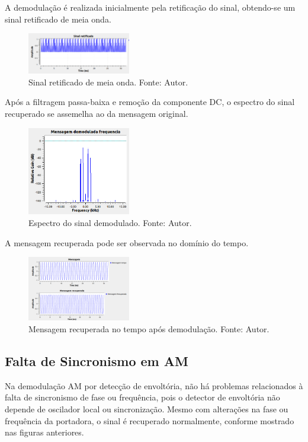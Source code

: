 A demodulação é realizada inicialmente pela retificação do sinal, obtendo-se um sinal retificado de meia onda.

\begin{figure}[!htpb]
    \centering
    \includegraphics[width=0.4\textwidth]{images/retificado_gnu.png}
    \caption{Sinal retificado de meia onda. Fonte: Autor.}
    \label{fig:retificado_am}
\end{figure}

Após a filtragem passa-baixa e remoção da componente DC, o espectro do sinal recuperado se assemelha ao da mensagem original.

\begin{figure}[!htpbh]
    \centering
    \includegraphics[width=0.4\textwidth]{images/mensagem_demodulada_gnu_espectro.png}
    \caption{Espectro do sinal demodulado. Fonte: Autor.}
    \label{fig:espectro_demodulada_am}
\end{figure}

A mensagem recuperada pode ser observada no domínio do tempo.

\begin{figure}[!htpb]
    \centering
    \includegraphics[width=0.4\textwidth]{images/mesagem_enviada_recuperada_am.png}
    \caption{Mensagem recuperada no tempo após demodulação. Fonte: Autor.}
    \label{fig:mensagem_recuperada_am}
\end{figure}

\subsection{Falta de Sincronismo em AM}

Na demodulação AM por detecção de envoltória, não há problemas relacionados à falta de sincronismo de fase ou frequência, pois o detector de envoltória não depende de oscilador local ou sincronização. Mesmo com alterações na fase ou frequência da portadora, o sinal é recuperado normalmente, conforme mostrado nas figuras anteriores.


